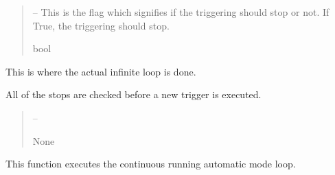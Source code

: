 \documentclass[letterpaper,11pt,english]{sphinxmanual}
\begin{document}
\begin{savenotes}
\begin{fulllineitems}
\begin{savenotes}
\begin{fulllineitems}
\begin{quote}
\begin{description}
\sphinxAtStartPar
{} – This is the flag which signifies if the triggering should stop or
not. If True, the triggering should stop.

\sphinxAtStartPar
bool

\end{description}\end{quote}

\end{fulllineitems}\end{savenotes}


\begin{savenotes}\begin{fulllineitems}
\label{\detokenize{code/opihiexarata.gui.automatic:opihiexarata.gui.automatic.OpihiAutomaticWindow._automatic_triggering_infinite_loop}}
\pysigstartsignatures
{}
\pysigstopsignatures
\sphinxAtStartPar
This is where the actual infinite loop is done.

\sphinxAtStartPar
All of the stops are checked before a new trigger is executed.
\begin{quote}\begin{description}
\sphinxAtStartPar
{} – 

\sphinxAtStartPar
None

\end{description}\end{quote}

\end{fulllineitems}\end{savenotes}


\begin{savenotes}\begin{fulllineitems}
\label{\detokenize{code/opihiexarata.gui.automatic:opihiexarata.gui.automatic.OpihiAutomaticWindow.automatic_triggering}}
\pysigstartsignatures
{}
\pysigstopsignatures
\sphinxAtStartPar
This function executes the continuous running automatic mode loop.


\end{fulllineitems}
\end{savenotes}
\end{fulllineitems}
\end{savenotes}
\end{document}
